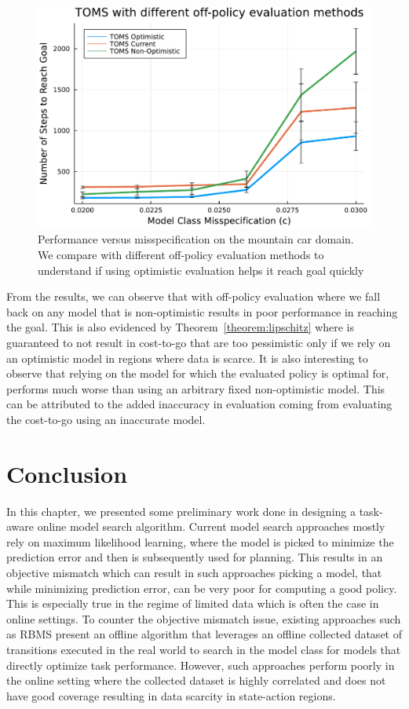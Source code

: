 \begin{figure}[t]
  \centering
  \includegraphics[width=0.5\linewidth]{figures/taml/mountain_car_online_model_search_toms_dense.pdf}
  \caption{Performance versus misspecification on the mountain car
    domain. We compare \taml{} with different off-policy evaluation
    methods to understand if using optimistic evaluation helps it
    reach goal quickly}
  \label{fig:evaluation}
\end{figure}

From the results, we can observe that \taml{} with off-policy
evaluation where we fall back on any model that is non-optimistic
results in poor performance in reaching the goal. This is also
evidenced by Theorem~\ref{theorem:lipschitz} where \taml{} is
guaranteed to not result in cost-to-go that are too pessimistic only
if we rely on an optimistic model in regions where data is scarce. It
is also interesting to observe that relying on the model for which the
evaluated policy is optimal for, performs much worse than using an
arbitrary fixed non-optimistic model. This can be attributed to the
added inaccuracy in evaluation coming from evaluating the cost-to-go
using an inaccurate model. 

\section{Conclusion}
\label{sec:discussion-1}

In this chapter, we presented some preliminary work done in designing
a task-aware online model search algorithm. Current model search
approaches mostly rely on maximum likelihood learning, where the model
is picked to minimize the prediction error and then is subsequently
used for planning. This results in an objective mismatch which can
result in such approaches picking a model, that while minimizing
prediction error, can be very poor for computing a good policy. This
is especially true in the regime of limited data which is often the
case in online settings. To counter the objective mismatch issue,
existing approaches such as RBMS present an offline algorithm that
leverages an offline collected dataset of transitions executed in the
real world to search in the model class for models that directly
optimize task performance. However, such approaches perform poorly in
the online setting where the collected dataset is highly correlated
and does not have good coverage resulting in data scarcity in
state-action regions.

